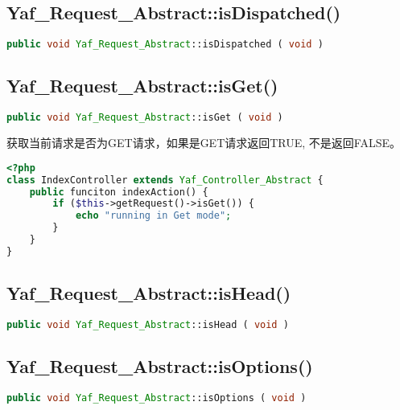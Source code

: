 \subsection{Yaf\_Request\_Abstract::isDispatched()}




\begin{lstlisting}[language=PHP]
public void Yaf_Request_Abstract::isDispatched ( void )
\end{lstlisting}


\subsection{Yaf\_Request\_Abstract::isGet()}

\begin{lstlisting}[language=PHP]
public void Yaf_Request_Abstract::isGet ( void )
\end{lstlisting}

获取当前请求是否为GET请求，如果是GET请求返回TRUE, 不是返回FALSE。



\begin{lstlisting}[language=PHP]
<?php
class IndexController extends Yaf_Controller_Abstract {
    public funciton indexAction() {
        if ($this->getRequest()->isGet()) {
            echo "running in Get mode";
        }
    }
}
\end{lstlisting}



\subsection{Yaf\_Request\_Abstract::isHead()}



\begin{lstlisting}[language=PHP]
public void Yaf_Request_Abstract::isHead ( void )
\end{lstlisting}


\subsection{Yaf\_Request\_Abstract::isOptions()}





\begin{lstlisting}[language=PHP]
public void Yaf_Request_Abstract::isOptions ( void )
\end{lstlisting}


